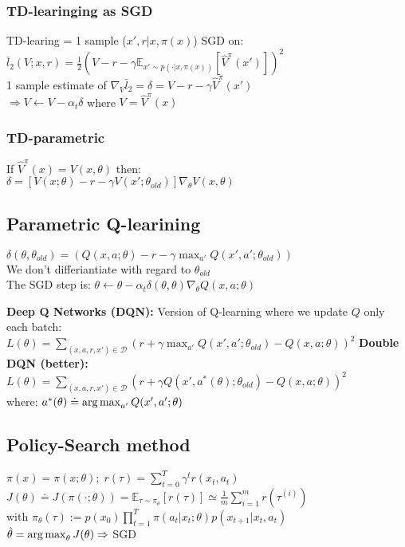 \subsubsection{TD-learinging as SGD}
TD-learing = 1 sample ($x', r \vert x, \pi(x)$) SGD on:\\
$\bar{l}_2(V;x,r) = \frac{1}{2}\left(V-r-\gamma\mathbb{E}_{x'\sim p(\cdot\vert x, \pi(x))}\left[\hat{V}^\pi(x')\right]\right)^2$\\
1 sample estimate of $\nabla_V \bar{l}_2 = \delta = V-r-\gamma \hat{V}^\pi(x')$\\
$\Rightarrow V\gets V - \alpha_t \delta$ where $V = \hat{V}^\pi(x)$

\subsubsection{TD-parametric}
If $\hat{V}^\pi(x) = V(x,\theta)$ then: \\
$\delta = \left[ V(x;\theta)-r-\gamma V(x';\theta_{old})\right] \nabla_\theta V(x,\theta)$

\subsection{Parametric Q-learining}
$\delta (\theta, \theta_{old}) = \left(Q(x,a;\theta)-r-\gamma\max_{a'} Q(x',a';\theta_{old})\right)$\\
We don't differiantiate with regard to $\theta_{old}$\\
The SGD step is:
$\theta \gets \theta - \alpha_t \delta(\theta, \theta) \nabla_\theta Q(x,a;\theta)$

\textbf{Deep Q Networks (DQN):} Version of Q-learning where we update $Q$ only each batch:\\
{\scriptsize $L(\theta) = \sum_{(x,a,r,x')\in\mathcal{D}}\left(r+\gamma\max_{a'}Q(x',a';\theta_{old})-Q(x,a;\theta)\right)^2$}
\textbf{Double DQN (better):} \\
{\scriptsize $L(\theta) = \sum_{(x,a,r,x')\in\mathcal{D}}\left(r+\gamma Q(x',a^*(\theta);\theta_{old})-Q(x,a;\theta)\right)^2$}\\
where: $a^*(\theta) \doteq \operatorname*{arg\,max}_{a'}Q(x',a'; \theta)$

\subsection{Policy-Search method}
$\pi(x) = \pi(x;\theta); \; r(\tau) = \sum_{t=0}^T\gamma^t r(x_t,a_t)$\\
$J(\theta)\doteq J(\pi(\cdot;\theta))= \mathbb{E}_{\tau \sim \pi_\theta}\left[r(\tau)\right] \simeq \frac{1}{m}\sum_{i=1}^m r(\tau^{(i)})$ \\
with $\pi_\theta (\tau) := p(x_0)\prod_{t=1}^T\pi(a_t\vert x_t; \theta)p(x_{t+1}\vert x_t,a_t)$\\
$\hat{\theta} = \operatorname*{arg\,max}_\theta J(\theta) \Rightarrow$ SGD 

